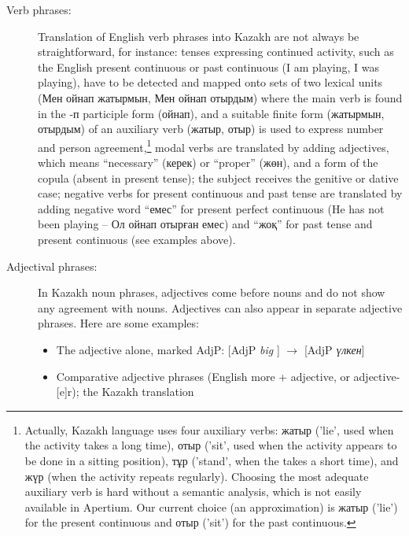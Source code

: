 \documentclass[11pt]{article}
\begin{document}
\begin{description}
\begin{itemize}
    \end{itemize}
\item[Verb phrases:] Translation of English verb phrases into Kazakh  are not always be straightforward, for instance: 
tenses expressing continued activity, such as the 
  English present continuous or past continuous (I am playing, I was playing), have to be detected and 
  mapped onto sets of two lexical units (Мен ойнап жатырмын, Мен ойнап отырдым) where the main verb is 
  found in the -п participle form (ойнап), and a suitable finite form  (жатырмын, отырдым) of an auxiliary 
  verb (жатыр, отыр) is used to express number and person agreement,\footnote{Actually, Kazakh language uses four auxiliary verbs: жатыр ('lie', 
      used when the activity takes a long time), отыр ('sit', used when the activity appears to be done in a sitting position), тұр ('stand', 
      when the takes a short time), and жүр (when the activity repeats regularly). Choosing the most adequate auxiliary verb is 
      hard without a semantic analysis, which is not easily available in Apertium. Our current choice (an approximation) 
      is жатыр ('lie') for the present continuous and отыр ('sit') for the past continuous.} 
  modal verbs are translated by adding adjectives, which means ``necessary'' (керек) or ``proper'' (жөн), 
  and a form of the copula (absent in present tense); the subject receives the genitive or dative case; negative 
  verbs for present continuous and past tense are translated by adding negative word ``емес'' for present 
  perfect continuous (He has not been playing -- Ол ойнап отырған емес) and  ``жоқ'' for past tense and 
  present continuous (see examples above).
\item[Adjectival phrases:] In Kazakh noun phrases, adjectives come before nouns and do not show any agreement 
  with nouns.  Adjectives can also appear in separate adjective phrases. Here are some examples:
\begin{itemize}
\item The adjective alone, marked AdjP: [AdjP \emph{big} ] $\rightarrow$ [AdjP \emph{үлкен}] 
\item Comparative adjective phrases  (English more + adjective, or adjective-[e]r); the Kazakh translation 

\end{itemize}
\end{description}
\end{document}
